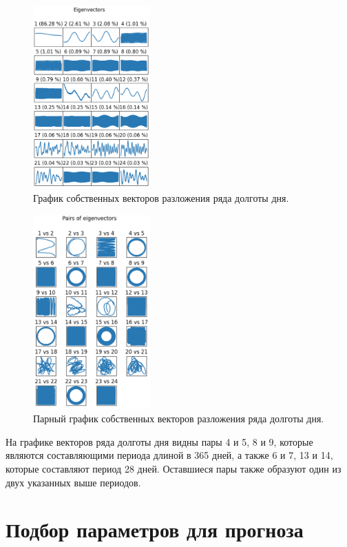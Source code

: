 \documentclass[specialist,
			   substylefile = spbu_report.rtx,
			   subf,href,colorlinks=true, 12pt]{disser}
\begin{document}
\begin{figure}[H]
	\centering
	\includegraphics[width=0.4\textwidth]{py_lod_vectors}
	\caption{График собственных векторов разложения ряда долготы дня.}
	\label{fig:py_lod_vectors}
\end{figure}

\begin{figure}[H]
	\centering
	\includegraphics[width=0.4\textwidth]{py_lod_pairs}
	\caption{Парный график собственных векторов разложения ряда долготы дня.}
	\label{fig:py_lod_pairs}
\end{figure}

На графике векторов ряда долготы дня видны пары  4 и 5, 8 и 9, которые являются составляющими периода длиной в 365 дней, а также 6 и 7, 13 и 14, которые составляют период 28 дней. Оставшиеся пары также образуют один из двух указанных выше периодов.\\

\section{Подбор параметров для прогноза}
\end{document}
